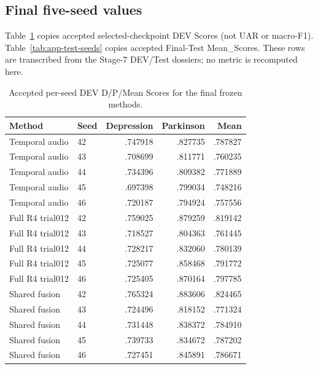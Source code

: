 \subsection{Final five-seed values}

Table~\ref{tab:app-dev-seeds} copies accepted selected-checkpoint DEV Scores (not UAR or macro-F1). Table~\ref{tab:app-test-seeds} copies accepted Final-Test Mean\_Scores. These rows are transcribed from the Stage-7 DEV/Test dossiers; no metric is recomputed here.

\begin{table}[t]
\centering\scriptsize
\caption{Accepted per-seed DEV D/P/Mean Scores for the final frozen methods.}
\label{tab:app-dev-seeds}
\begin{tabular}{llrrr}
\toprule
Method & Seed & Depression & Parkinson & Mean\\
\midrule
Temporal audio & 42 & .747918 & .827735 & .787827\\
Temporal audio & 43 & .708699 & .811771 & .760235\\
Temporal audio & 44 & .734396 & .809382 & .771889\\
Temporal audio & 45 & .697398 & .799034 & .748216\\
Temporal audio & 46 & .720187 & .794924 & .757556\\
\addlinespace
Full R4 trial012 & 42 & .759025 & .879259 & .819142\\
Full R4 trial012 & 43 & .718527 & .804363 & .761445\\
Full R4 trial012 & 44 & .728217 & .832060 & .780139\\
Full R4 trial012 & 45 & .725077 & .858468 & .791772\\
Full R4 trial012 & 46 & .725405 & .870164 & .797785\\
\addlinespace
Shared fusion & 42 & .765324 & .883606 & .824465\\
Shared fusion & 43 & .724496 & .818152 & .771324\\
Shared fusion & 44 & .731448 & .838372 & .784910\\
Shared fusion & 45 & .739733 & .834672 & .787202\\
Shared fusion & 46 & .727451 & .845891 & .786671\\
\bottomrule
\end{tabular}
\end{table}

